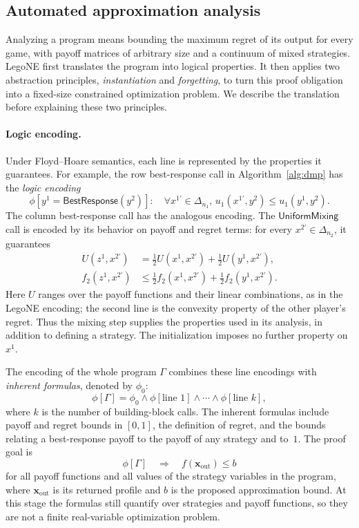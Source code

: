 \documentclass[11pt]{article}
\theoremstyle{remark}
\theoremstyle{plain}
\newcommand{\br}{\mathsf{BestResponse}}
\newcommand{\um}{\mathsf{UniformMixing}}
\begin{document}
\subsection{Automated approximation analysis}
\label{sec:legone-instantiation}

Analyzing a program means bounding the maximum regret of its output
for every game, with payoff matrices of arbitrary size and a continuum of mixed
strategies. LegoNE first translates the program into logical
properties. It then applies two abstraction principles,
\emph{instantiation} and \emph{forgetting}, to turn this proof
obligation into a fixed-size constrained optimization problem.
We describe the translation before explaining these two principles.

\paragraph{Logic encoding.}
Under Floyd--Hoare semantics, each line is represented by the
properties it guarantees. For example, the row best-response call
in Algorithm~\ref{alg:dmp} has the \emph{logic encoding}
\begin{equation}
 \phi[y^1=\br(y^2)]:\quad
 \forall x^{1\prime}\in\Delta_{n_1},\,
 u_1(x^{1\prime},y^2)\le u_1(y^1,y^2).
 \label{eq:dmp-properties}
\end{equation}
The column best-response call has the analogous encoding.
The $\um$ call is encoded by its behavior on payoff and regret
terms: for every $x^{2\prime}\in\Delta_{n_2}$, it guarantees
\[
 \begin{aligned}
  U(z^1,x^{2\prime})
   &=\tfrac12 U(x^1,x^{2\prime})+\tfrac12 U(y^1,x^{2\prime}),\\
  f_2(z^1,x^{2\prime})
   &\le\tfrac12 f_2(x^1,x^{2\prime})+\tfrac12 f_2(y^1,x^{2\prime}).
 \end{aligned}
\]
Here $U$ ranges over the payoff functions and their linear combinations,
as in the LegoNE encoding; the second line is the convexity property
of the other player's regret. Thus the mixing step supplies the
properties used in its analysis, in addition to defining a strategy.
The initialization imposes no further property on $x^1$.

The encoding of the whole program $\Gamma$ combines these line
encodings with \emph{inherent formulas}, denoted by $\phi_0$:
\[
 \phi[\Gamma]
 =\phi_0\wedge\phi[\text{line }1]\wedge\cdots
          \wedge\phi[\text{line }k],
\]
where $k$ is the number of building-block calls. The inherent formulas
include payoff and regret bounds in $[0,1]$, the definition of regret,
and the bounds relating a best-response payoff to the payoff of any
strategy and to~$1$. The proof goal is
\[
 \phi[\Gamma]\quad\Longrightarrow\quad
 f(\boldsymbol{x}_{\mathrm{out}})\le b
\]
for all payoff functions and all values of the strategy variables in
the program, where $\boldsymbol{x}_{\mathrm{out}}$ is its returned
profile and $b$ is the proposed approximation bound. At this stage the formulas still quantify over strategies
and payoff functions, so they are not a finite real-variable
optimization problem.
\end{document}
